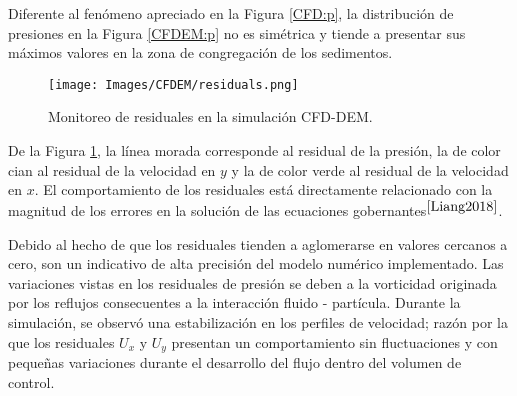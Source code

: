 \noindent
\justify

Diferente al fen\'omeno apreciado en la Figura \ref{CFD:p}, la distribuci\'on de presiones en la Figura \ref{CFDEM:p} no es sim\'etrica y tiende a presentar sus m\'aximos valores en la zona de congregaci\'on de los sedimentos.

\begin{figure}[h!]
	\centering
	\texttt{[image: Images/CFDEM/residuals.png]}
	\caption{Monitoreo de residuales en la simulaci\'on CFD-DEM.}
	\label{CFDEM:residuals}
\end{figure}

\noindent
\justify

De la Figura \ref{CFDEM:residuals}, la l\'inea morada corresponde al residual de la presi\'on, la de color cian al residual de la velocidad en $y$ y la de color verde al residual de la velocidad en $x$. El comportamiento de los residuales est\'a directamente relacionado con la magnitud de los errores en la soluci\'on de las ecuaciones gobernantes$^{\cite{Liang2018}}$. 

\newpage

\noindent
\justify

Debido al hecho de que los residuales tienden a aglomerarse en valores cercanos a cero, son un indicativo de alta precisi\'on del modelo num\'erico implementado. Las variaciones vistas en los residuales de presi\'on se deben a la vorticidad originada por los reflujos consecuentes a la interacci\'on fluido - part\'icula. Durante la simulaci\'on, se observ\'o una estabilizaci\'on en los perfiles de velocidad; raz\'on por la que los residuales $U_x$ y $U_y$ presentan un comportamiento sin fluctuaciones y con peque\~nas variaciones durante el desarrollo del flujo dentro del volumen de control.